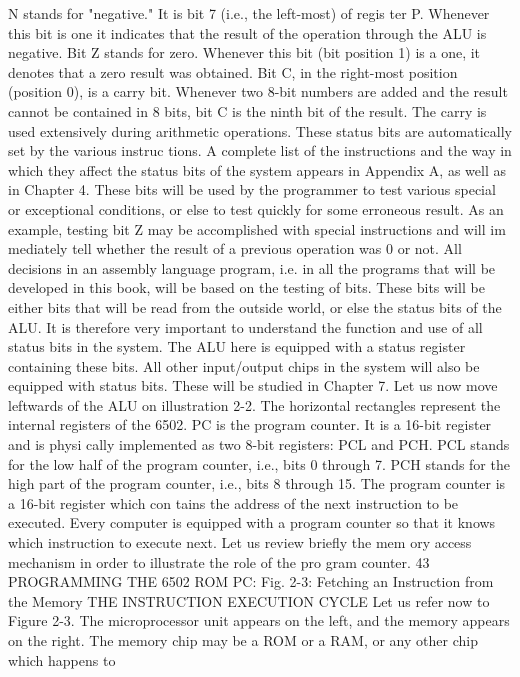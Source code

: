 N stands for "negative." It is bit 7 (i.e., the left-most) of regis
ter P. Whenever this bit is one it indicates that the result of the
operation through the ALU is negative.
Bit Z stands for zero. Whenever this bit (bit position 1) is a one,
it denotes that a zero result was obtained.
Bit C, in the right-most position (position 0), is a carry bit.
Whenever two 8-bit numbers are added and the result cannot be
contained in 8 bits, bit C is the ninth bit of the result. The carry is
used extensively during arithmetic operations.
These status bits are automatically set by the various instruc
tions. A complete list of the instructions and the way in which
they affect the status bits of the system appears in Appendix A, as
well as in Chapter 4. These bits will be used by the programmer to
test various special or exceptional conditions, or else to test
quickly for some erroneous result. As an example, testing bit Z
may be accomplished with special instructions and will im
mediately tell whether the result of a previous operation was 0
or not. All decisions in an assembly language program, i.e. in all
the programs that will be developed in this book, will be based on
the testing of bits. These bits will be either bits that will be read
from the outside world, or else the status bits of the ALU. It is
therefore very important to understand the function and use of all
status bits in the system. The ALU here is equipped with a status
register containing these bits. All other input/output chips in the
system will also be equipped with status bits. These will be
studied in Chapter 7.
Let us now move leftwards of the ALU on illustration 2-2. The
horizontal rectangles represent the internal registers of the 6502.
PC is the program counter. It is a 16-bit register and is physi
cally implemented as two 8-bit registers: PCL and PCH. PCL
stands for the low half of the program counter, i.e., bits 0 through
7. PCH stands for the high part of the program counter, i.e., bits 8
through 15. The program counter is a 16-bit register which con
tains the address of the next instruction to be executed. Every
computer is equipped with a program counter so that it knows
which instruction to execute next. Let us review briefly the mem
ory access mechanism in order to illustrate the role of the pro
gram counter.
43
PROGRAMMING THE 6502
ROM
PC:
Fig. 2-3: Fetching an Instruction from the Memory
THE INSTRUCTION EXECUTION CYCLE
Let us refer now to Figure 2-3. The microprocessor unit appears
on the left, and the memory appears on the right. The memory
chip may be a ROM or a RAM, or any other chip which happens to
